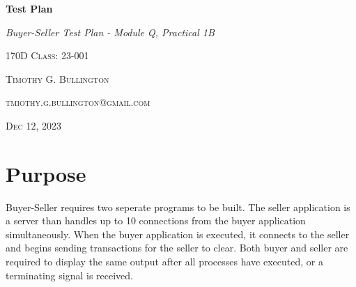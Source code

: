 \documentclass{article}
\begin{document}
\begin{titlepage}
    \begin{center}
        \vspace*{6cm}

        
        \textbf{\Huge{Test Plan}}
            
        \vspace{0.5cm}
        \textit{\large{Buyer-Seller Test Plan - Module Q, Practical 1B}}
        \vspace{0.5cm}
        
        \textsc{\large{170D Class: 23-001}}
            
        \vspace{7.5cm}
            
        \textsc{\small{Timothy G. Bullington}}
        \vspace{0.5cm}
        
        
        
        \textsc{\small{tmiothy.g.bullington@gmail.com}}

        \vspace{0.5cm}
        \textsc{\small{Dec 12, 2023}}

            

    \end{center}
\end{titlepage}


\section{Purpose}

Buyer-Seller requires two seperate programs to be built. The seller application is a server than handles up to 10 connections from the buyer application simultaneously. When the buyer application is executed, it connects to the seller and begins sending transactions for the seller to clear. Both buyer and seller are required to display the same output after all processes have executed, or a terminating signal is received. \\
\end{document}
